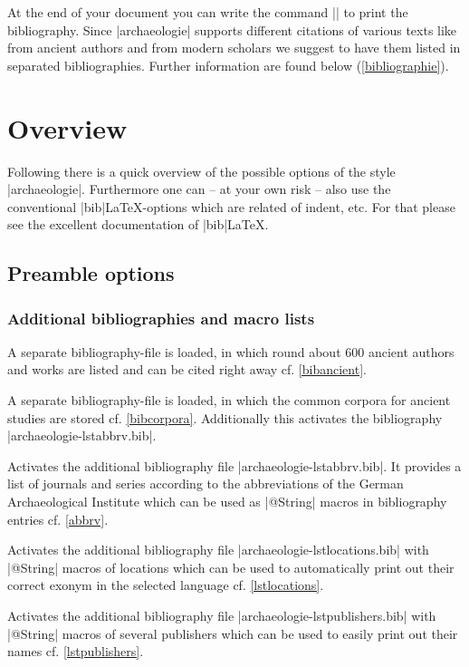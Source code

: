 \documentclass[a4paper,
10pt,
greek,
french,
spanish,
italian,
ngerman,
english
]{ltxdoc}
\begin{document}
At the end of your document you can write the command |\printbibliography| to print 
the bibliography. 
Since |archaeologie| supports different citations of various texts like from ancient authors and from modern scholars we suggest to have them listed in separated bibliographies. 
Further information are found below   (\cref{bibliographie}).

\section{Overview}
Following there is a quick overview of the possible options of the style |archaeologie|.
Furthermore one can -- at your own risk -- also use the conventional  |bib|\LaTeX-options which are related of indent, etc. 
For that please see the excellent documentation of  |bib|\LaTeX.

\subsection{Preamble options}\label{preamble_options}
\subsubsection{Additional bibliographies and macro lists}
A separate bibliography-file is loaded, in which round about 600 ancient authors and works are listed and can be cited right away cf. \cref{bibancient}.

A separate bibliography-file is loaded, in which the common corpora for ancient studies are stored cf. \cref{bibcorpora}.
Additionally this activates the bibliography |archaeologie-lstabbrv.bib|.

Activates the additional bibliography file |archaeologie-lstabbrv.bib|.
It provides a list of journals and series according to the abbreviations of the German Archaeological Institute which can be used as |@String| macros in bibliography entries cf. \cref{abbrv}. 

Activates the additional bibliography file |archaeologie-lstlocations.bib|
with |@String| macros of locations which can be used to automatically print out their correct exonym in the selected language cf. \cref{lstlocations}.

Activates the additional bibliography file |archaeologie-lstpublishers.bib| with |@String| macros of several publishers which can be used to easily print out their names cf. \cref{lstpublishers}.
\end{document}
